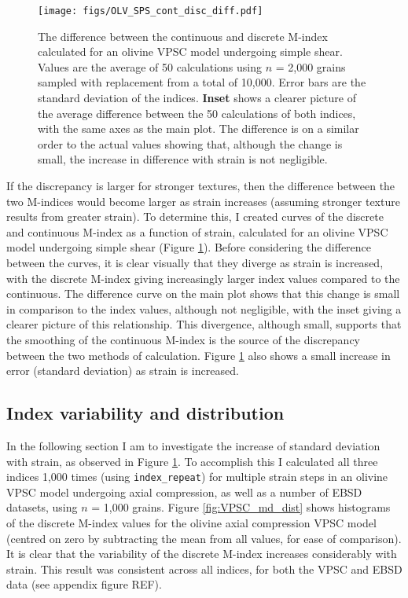 \documentclass[a4paper,12pt,twoside]{report}
\numberwithin{equation}{chapter}
\begin{document}
\begin{figure}[h]
  \centering
    \texttt{[image: figs/OLV\_SPS\_cont\_disc\_diff.pdf]}
  \caption[Discrete and continuous M-index difference (olivine VPSC)]{The difference between the continuous and discrete M-index calculated for an olivine VPSC model undergoing simple shear. Values are the average of 50 calculations using $n$ = 2,000 grains sampled with replacement from a total of 10,000. Error bars are the standard deviation of the indices. \textbf{Inset} shows a clearer picture of the average difference between the 50 calculations of both indices, with the same axes as the main plot. The difference is on a similar order to the actual values showing that, although the change is small, the increase in difference with strain is not negligible.}
  \label{fig:OLV_SPS_cont_disc_diff}
\end{figure}  

If the discrepancy is larger for stronger textures, then the difference between the two M-indices would become larger as strain increases (assuming stronger texture results from greater strain). To determine this, I created curves of the discrete and continuous M-index as a function of strain, calculated for an olivine VPSC model undergoing simple shear (Figure \ref{fig:OLV_SPS_cont_disc_diff}). Before considering the difference between the curves, it is clear visually that they diverge as strain is increased, with the discrete M-index giving increasingly larger index values compared to the continuous. The difference curve on the main plot shows that this change is small in comparison to the index values, although not negligible, with the inset giving a clearer picture of this relationship. This divergence, although small, supports that the smoothing of the continuous M-index is the source of the discrepancy between the two methods of calculation. Figure \ref{fig:OLV_SPS_cont_disc_diff} also shows a small increase in error (standard deviation) as strain is increased. 

\subsection{Index variability and distribution}

In the following section I am to investigate the increase of standard deviation with strain, as observed in Figure \ref{fig:OLV_SPS_cont_disc_diff}. To accomplish this I calculated all three indices 1,000 times (using \texttt{index\_repeat}) for multiple strain steps in an olivine VPSC model undergoing axial compression, as well as a number of EBSD datasets, using $n$ = 1,000 grains. Figure \ref{fig:VPSC_md_dist} shows histograms of the discrete M-index values for the olivine axial compression VPSC model (centred on zero by subtracting the mean from all values, for ease of comparison). It is clear that the variability of the discrete M-index increases considerably with strain. This result was consistent across all indices, for both the VPSC and EBSD data (see appendix figure REF).
\end{document}
